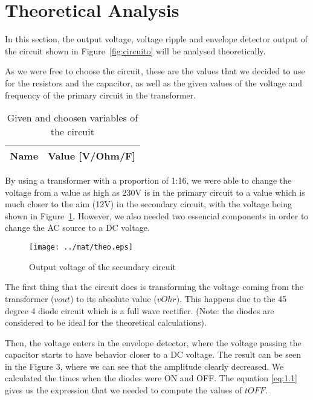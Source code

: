 \section{Theoretical Analysis}
\label{sec:analysis}

\hspace{0,5cm} In this section, the output voltage, voltage ripple and envelope detector output of the circuit shown in Figure~\ref{fig:circuito} will be analysed theoretically.

As we were free to choose the circuit, these are the values that we decided to use for the resistors and the capacitor, as well as the given values of the voltage and frequency of the primary circuit in the transformer.

\begin{table}[H]
  \centering
  \begin{tabular}{|l|r|}
    \hline    
    {\bf Name} & {\bf Value [V/Ohm/F]} \\ \hline
    
  \end{tabular}
  \caption{Given and choosen variables of the circuit}
  \label{tab:mat1}
\end{table}

By using a transformer with a proportion of 1:16, we were able to change the voltage from a value as high as 230V is in the primary circuit to a value which is much closer to the aim (12V) in the secondary circuit, with the voltage being shown in Figure~\ref{fig:mat2}. However, we also needed two essencial components in order to change the AC source to a DC voltage.

\begin{figure}[H] \centering
\texttt{[image: ../mat/theo.eps]}
\caption{Output voltage of the secundary circuit}
\label{fig:mat2}
\end{figure}

The first thing that the circuit does is transforming the voltage coming from the transformer ($vout$) to its absolute value ($vOhr$). This happens due to the 45 degree 4 diode circuit which is a full wave rectifier. (Note: the diodes are considered to be ideal for the theoretical calculations).

Then, the voltage enters in the envelope detector, where the voltage passing the capacitor starts to have behavior closer to a DC voltage. The result can be seen in the Figure 3, where we can see that the amplitude clearly decreased. We calculated the times when the diodes were ON and OFF. The equation \ref{eq:1.1} gives us the expression that we needed to compute the values of $tOFF$.

